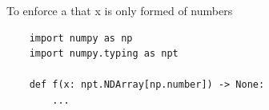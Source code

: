 To enforce a that x is only formed of numbers
\begin{verbatim}
    import numpy as np
    import numpy.typing as npt
    
    def f(x: npt.NDArray[np.number]) -> None:
        ...
\end{verbatim}